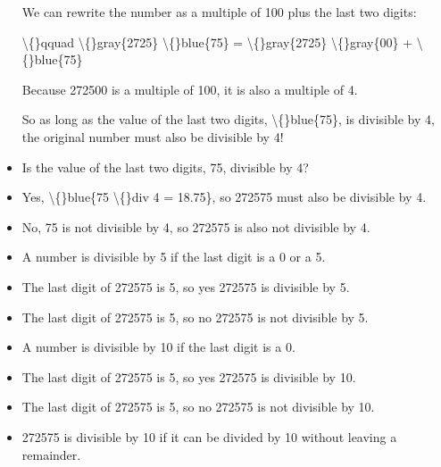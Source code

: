\documentclass{article}
\begin{document}
\begin{itemize}
                    
                        
                            We can rewrite the number as a multiple of
                            100 plus the last two digits:
                        
                        \textbackslash\{\}qquad
                        \textbackslash\{\}gray\{2725\}
                        \textbackslash\{\}blue\{75\} =
                        \textbackslash\{\}gray\{2725\}
                        \textbackslash\{\}gray\{00\} +
                        \textbackslash\{\}blue\{75\}
                        
                        
                            Because 272500 is a multiple of 100,
                            it is also a multiple of 4.
                        
                        
                            So as long as the value of the last two digits,
                            \textbackslash\{\}blue\{75\},
                            is divisible by 4, the original
                            number must also be divisible by 4!
  \item Is the value of the last two digits,
                    75,
                    divisible by 4?
  \item Yes,
                    \textbackslash\{\}blue\{75 \textbackslash\{\}div 4 =
                    18.75\}, so
                    272575 must also be divisible by
                    4.
  \item No, 75 is not
                    divisible by 4, so
                    272575 is also not divisible by
                    4.
  \item A number is divisible by 5 if the last
                    digit is a 0 or a 5.
  \item The last digit of 272575 is
                    5, so yes
                    272575 is divisible by
                    5.
  \item The last digit of 272575 is
                    5, so no
                    272575 is not divisible by
                    5.
  \item A number is divisible by 10 if the last
                    digit is a 0.
  \item The last digit of 272575 is
                    5, so yes
                    272575 is divisible by
                    10.
  \item The last digit of 272575 is
                    5, so no
                    272575 is not divisible by
                    10.
  \item 272575 is divisible by
            10 if it can be divided by
            10 without leaving a remainder.
\end{itemize}
\end{document}
